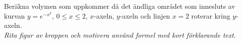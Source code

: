 \documentclass[11pt]{article}
\begin{document}
Beräkna volymen som uppkommer då det ändliga området som innesluts av kurvan $y = e^{-x^2}$, $0 \leq x \leq 2$, $x$-axeln, $y$-axeln och linjen $x = 2$ roterar kring $y$-axeln.\\
\textit{Rita figur av kroppen och motivera använd formel med kort förklarande text}.
\end{document}
